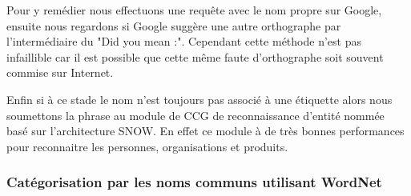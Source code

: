 \documentclass[10pt,a4paper]{article}
\begin{document}
\par Pour y remédier nous effectuons une requête avec le nom propre sur Google, ensuite nous regardons si Google suggère une autre orthographe par l'intermédiaire du "Did you mean :". Cependant cette méthode n'est pas infaillible car il est possible que cette même faute d'orthographe soit souvent commise sur Internet.
\par Enfin si à ce stade le nom n'est toujours pas associé à une étiquette alors nous soumettons la phrase au module de CCG de reconnaissance d'entité nommée~\cite{ratinov:paper} basé sur l'architecture SNOW. En effet ce module à de très bonnes performances pour reconnaitre les personnes, organisations et produits.


\subsubsection{Catégorisation par les noms communs utilisant WordNet}
\end{document}
